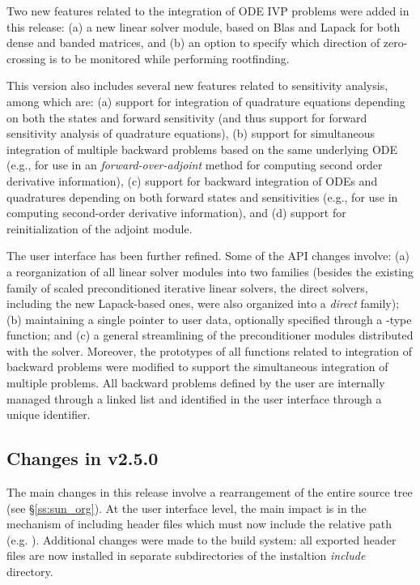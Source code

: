 Two new features related to the integration of ODE IVP problems were added 
in this release: (a) a new linear solver module, based on Blas and Lapack 
for both dense and banded matrices, and (b) an option to specify which direction 
of zero-crossing is to be monitored while performing rootfinding. 

This version also includes several new features related to sensitivity analysis,
among which are: (a) support for integration of quadrature equations depending
on both the states and forward sensitivity (and thus support for forward sensitivity
analysis of quadrature equations), (b) support for simultaneous integration of 
multiple backward problems based on the same underlying ODE (e.g., for use
in an {\em forward-over-adjoint} method for computing second order derivative
information), (c) support for backward integration of ODEs and quadratures 
depending on both forward states and sensitivities (e.g., for use in computing 
second-order derivative information), and (d) support for reinitialization of 
the adjoint module.

The user interface has been further refined. Some of the API changes involve:
(a) a reorganization of all linear solver modules into two families (besides 
the existing family of scaled preconditioned iterative linear solvers,
the direct solvers, including the new Lapack-based ones, were also organized 
into a {\em direct} family); (b) maintaining a single pointer to user data,
optionally specified through a -type function; and (c) a general 
streamlining of the preconditioner modules distributed with the solver.
Moreover, the prototypes of all functions related to integration of backward 
problems were modified to support the simultaneous integration of multiple 
problems. All backward problems defined by the user are internally managed
through a linked list and identified in the user interface through a
unique identifier.


\subsection*{Changes in v2.5.0}

The main changes in this release involve a rearrangement of the entire 
{\sundials} source tree (see \S\ref{ss:sun_org}). At the user interface 
level, the main impact is in the mechanism of including {\sundials} header
files which must now include the relative path (e.g. ).
Additional changes were made to the build system: all exported header files are
now installed in separate subdirectories of the instaltion {\em include} directory.

